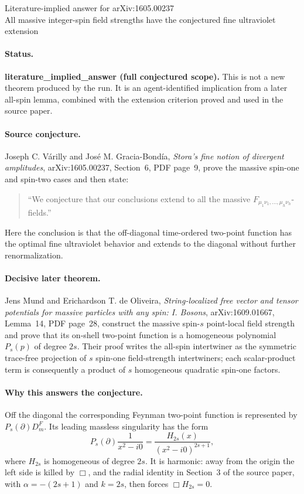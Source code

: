 \documentclass[11pt]{article}
\begin{document}
\begin{center}
{\Large Literature-implied answer for arXiv:1605.00237}\\[4pt]
{\large All massive integer-spin field strengths have the conjectured fine
ultraviolet extension}
\end{center}

\paragraph{Status.}
\textbf{literature\_implied\_answer (full conjectured scope).}
This is not a new theorem produced by the run.  It is an agent-identified
implication from a later all-spin lemma, combined with the extension criterion
proved and used in the source paper.

\paragraph{Source conjecture.}
Joseph C. V\'arilly and Jos\'e M. Gracia-Bond\'ia,
\emph{Stora's fine notion of divergent amplitudes}, arXiv:1605.00237,
Section~6, PDF page~9, prove the massive spin-one and spin-two cases and then
state:
\begin{quote}
``We conjecture that our conclusions extend to all the massive
$F_{\mu_1\nu_1,\ldots,\mu_h\nu_h}$-fields.''
\end{quote}
Here the conclusion is that the off-diagonal time-ordered two-point function
has the optimal fine ultraviolet behavior and extends to the diagonal without
further renormalization.

\paragraph{Decisive later theorem.}
Jens Mund and Erichardson T. de Oliveira,
\emph{String-localized free vector and tensor potentials for massive
particles with any spin: I. Bosons}, arXiv:1609.01667, Lemma~14,
PDF page~28, construct the massive spin-$s$ point-local field strength and
prove that its on-shell two-point function is a homogeneous polynomial
$P_s(p)$ of degree $2s$.  Their proof writes the all-spin intertwiner as the
symmetric trace-free projection of $s$ spin-one field-strength intertwiners;
each scalar-product term is consequently a product of $s$ homogeneous
quadratic spin-one factors.

\paragraph{Why this answers the conjecture.}
Off the diagonal the corresponding Feynman two-point function is represented
by $P_s(\partial)D_m^F$.  Its leading massless singularity has the form
\[
 P_s(\partial)\frac{1}{x^2-i0}
   =\frac{H_{2s}(x)}{(x^2-i0)^{2s+1}},
\]
where $H_{2s}$ is homogeneous of degree $2s$.  It is harmonic: away from the
origin the left side is killed by $\Box$, and the radial identity in
Section~3 of the source paper, with $\alpha=-(2s+1)$ and $k=2s$, then forces
$\Box H_{2s}=0$.
\end{document}
